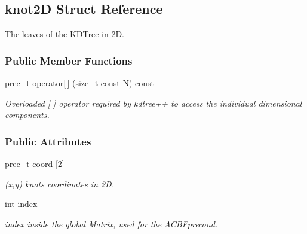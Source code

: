 \hypertarget{structknot2D}{
\subsection{knot2D Struct Reference}
\label{structknot2D}
}
The leaves of the \hyperlink{namespaceKDTree}{KDTree} in 2D.  


\subsubsection*{Public Member Functions}
\begin{CompactItemize}
\item 
\hyperlink{Traits_8hpp_81f62fadeebafe942380746e380c72a5}{prec\_\-t} \hyperlink{structknot2D_04b5b4239c2c808b41205b4159e786fa}{operator\mbox{[}$\,$\mbox{]}} (size\_\-t const N) const 
\begin{CompactList}\small\item\em Overloaded \mbox{[} \mbox{]} operator required by kdtree++ to access the individual dimensional components. \item\end{CompactList}\end{CompactItemize}
\subsubsection*{Public Attributes}
\begin{CompactItemize}
\item 
\hypertarget{structknot2D_7ddedf74db1c4f1706198bc87722a9bb}{
\hyperlink{Traits_8hpp_81f62fadeebafe942380746e380c72a5}{prec\_\-t} \hyperlink{structknot2D_7ddedf74db1c4f1706198bc87722a9bb}{coord} \mbox{[}2\mbox{]}}
\label{structknot2D_7ddedf74db1c4f1706198bc87722a9bb}

\begin{CompactList}\small\item\em (x,y) knots coordinates in 2D. \item\end{CompactList}\item 
\hypertarget{structknot2D_f9d6cc506ad009958a8ef7a0e492b97c}{
int \hyperlink{structknot2D_f9d6cc506ad009958a8ef7a0e492b97c}{index}}
\label{structknot2D_f9d6cc506ad009958a8ef7a0e492b97c}

\begin{CompactList}\small\item\em index inside the global Matrix, used for the ACBFprecond. \item\end{CompactList}\end{CompactItemize}


